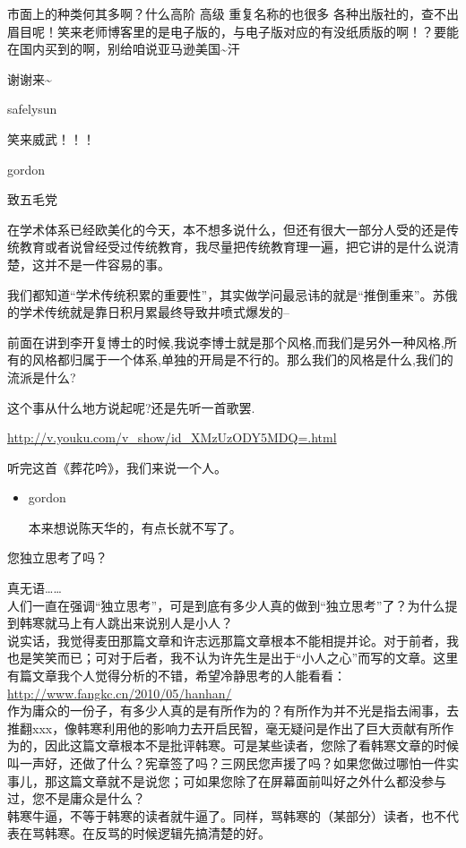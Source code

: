 市面上的种类何其多啊？什么高阶 高级 重复名称的也很多
各种出版社的，查不出眉目呢！笑来老师博客里的是电子版的，与电子版对应的有没纸质版的啊！？要能在国内买到的啊，别给咱说亚马逊美国\textasciitilde{}汗

谢谢来\textasciitilde{}

safelysun

笑来威武！！！

gordon

致五毛党

在学术体系已经欧美化的今天，本不想多说什么，但还有很大一部分人受的还是传统教育或者说曾经受过传统教育，我尽量把传统教育理一遍，把它讲的是什么说清楚，这并不是一件容易的事。

我们都知道``学术传统积累的重要性''，其实做学问最忌讳的就是``推倒重来''。苏俄的学术传统就是靠日积月累最终导致井喷式爆发的--

前面在讲到李开复博士的时候,我说李博士就是那个风格,而我们是另外一种风格,所有的风格都归属于一个体系,单独的开局是不行的。那么我们的风格是什么,我们的流派是什么?

这个事从什么地方说起呢?还是先听一首歌罢.

\href{/web/20131011170823/http://v.youku.com/v\_show/id\_XMzUzODY5MDQ=.html}{http://v.youku.com/v\_show/id\_XMzUzODY5MDQ=.html}

听完这首《葬花吟》，我们来说一个人。

\begin{itemize}[<+->]
\item
  gordon

  本来想说陈天华的，有点长就不写了。
\end{itemize}

您独立思考了吗？

真无语\ldots{}\ldots{}\\
人们一直在强调``独立思考''，可是到底有多少人真的做到``独立思考''了？为什么提到韩寒就马上有人跳出来说别人是小人？\\
说实话，我觉得麦田那篇文章和许志远那篇文章根本不能相提并论。对于前者，我也是笑笑而已；可对于后者，我不认为许先生是出于``小人之心''而写的文章。这里有篇文章我个人觉得分析的不错，希望冷静思考的人能看看：\\
\href{/web/20131011170823/http://www.fangkc.cn/2010/05/hanhan/}{http://www.fangkc.cn/2010/05/hanhan/}\\
作为庸众的一份子，有多少人真的是有所作为的？有所作为并不光是指去闹事，去推翻xxx，像韩寒利用他的影响力去开启民智，毫无疑问是作出了巨大贡献有所作为的，因此这篇文章根本不是批评韩寒。可是某些读者，您除了看韩寒文章的时候叫一声好，还做了什么？宪章签了吗？三网民您声援了吗？如果您做过哪怕一件实事儿，那这篇文章就不是说您；可如果您除了在屏幕面前叫好之外什么都没参与过，您不是庸众是什么？\\
韩寒牛逼，不等于韩寒的读者就牛逼了。同样，骂韩寒的（某部分）读者，也不代表在骂韩寒。在反骂的时候逻辑先搞清楚的好。

